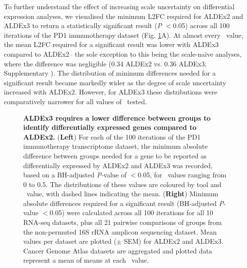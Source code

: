 \documentclass[10pt,letterpaper]{article}
\begin{document}
To further understand the effect of increasing scale uncertainty on differential expression analyses, we visualised the minimum L2FC required for ALDEx2 and ALDEx3 to return a statistically significant result (\textit{P} $<$0.05) across all 100 iterations of the PD1 immunotherapy dataset (Fig. \ref{fig:density}A). At almost every \textgamma~value, the mean L2FC required for a significant result was lower with ALDEx3 compared to ALDEx2-- the sole exception to this being the scale-na\"ive analyses, where the difference was negligible (0.34 ALDEx2 vs. 0.36 ALDEx3; Supplementary ). The distribution of minimum differences needed for a significant result became markedly wider as the degree of scale uncertainty increased with ALDEx2. However, for ALDEx3 these distributions were comparatively narrower for all values of \textgamma~tested.

\begin{figure}[H]
    \centering
    \caption{\textbf{ALDEx3 requires a lower difference between groups to identify differentially expressed genes compared to ALDEx2.} (\textbf{Left}) For each of the 100 iterations of the PD1 immunotherapy transcriptome dataset, the minimum absolute difference between groups needed for a gene to be reported as differentially expressed by ALDEx2 and ALDEx3 was recorded, based on a BH-adjusted \textit{P}-value of $<$0.05, for \textgamma~values ranging from 0 to 0.5. The distributions of these values are coloured by tool and \textgamma~value, with dashed lines indicating the mean. (\textbf{Right}) Minimum absolute differences required for a significant result (BH-adjusted \textit{P}-value $<$0.05) were calculated across all 100 iterations for all 10 RNA-seq datasets, plus all 21 pairwise comparisons of groups from the non-permuted 16S rRNA amplicon sequencing dataset. Mean values per dataset are plotted ($\pm$ SEM) for ALDEx2 and ALDEx3. Cancer Genome Atlas datasets are aggregated and plotted data represent a mean of means at each \textgamma~value.}
    \label{fig:density}
\end{figure}
\end{document}
